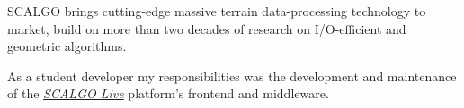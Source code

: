 SCALGO brings cutting-edge massive terrain data-processing technology to market,
build on more than two decades of research on I/O-efficient and geometric
algorithms.

\medskip

As a student developer my responsibilities was the development and maintenance
of the \href{https://scalgo.com/live/}{\emph{SCALGO Live}} platform's frontend
and middleware.
